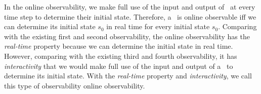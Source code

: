 
In the online observability, we make full use of the input and output of \BCNs\ at every time step to determine their initial state. Therefore, a \BCN\ is online observable iff we can determine its initial state $s_0$ in real time for every initial state $s_0$. Comparing with the existing first and second observability, the online observability has the {\em real-time} property because we can determine the initial state in real time. However, comparing with the existing third and fourth observability, it has {\em interactivity} that we would make full use of the input and output of a \BCN\ to determine its initial state. With the {\em real-time} property and {\em interactivity}, we call this type of observability online observability. %

